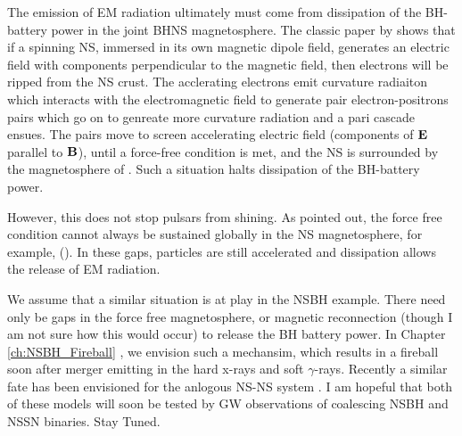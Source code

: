 The emission of EM radiation ultimately must come from dissipation of the BH-
battery power in the joint BHNS magnetosphere. The classic paper by
\cite{GJ:1969} shows that if a spinning NS, immersed in its own magnetic dipole
field, generates an electric field with components perpendicular to the
magnetic field, then electrons will be ripped from the NS crust. The
acclerating electrons emit curvature radiaiton which interacts with the
electromagnetic field to generate pair electron-positrons pairs which go on to
genreate more curvature radiation and a pari cascade ensues. The pairs move to
screen accelerating electric field (components of ${\bf E}$ parallel to
${\bf B}$), until a force-free condition is met, and the NS is surrounded by the
magnetosphere of \citep{GJ:1969}. Such a situation halts dissipation of the BH-battery power. 

However, this does not stop pulsars from shining.  As \citep{RudSuth:1975} pointed out, the force free condition cannot always be sustained globally in the NS magnetosphere, for example, (). In these gaps, particles are still accelerated and dissipation allows the release of EM radiation.

We assume that a similar situation is at play in the NSBH example. There need
only be gaps in the force free magnetosphere, or magnetic reconnection (though
I am not sure how this would occur) to release the BH battery power. In
Chapter \ref{ch:NSBH_Fireball} \citep{DL:2016}, we envision such a mechansim,
which results in a fireball soon after merger emitting in the hard x-rays and
soft $\gamma$-rays. Recently a similar fate has been envisioned for the
anlogous NS-NS system \citep{MetzgerNSNS:2016}. I am hopeful that both of
these models will soon be tested by GW observations of coalescing NSBH and
NSSN binaries. Stay Tuned.












